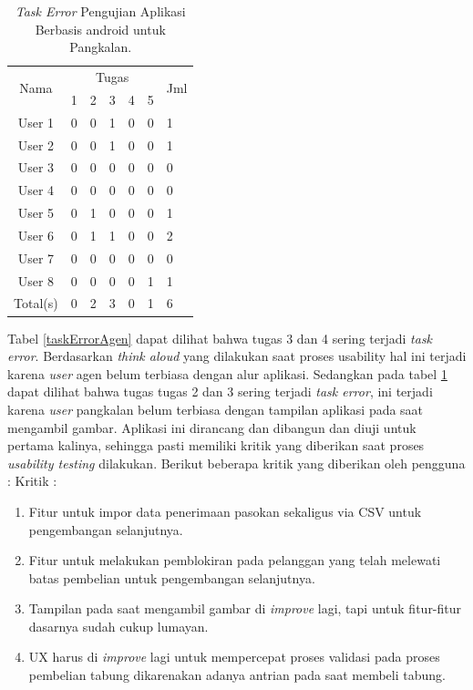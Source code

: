 \begin{table}[H]
	\center
	\caption{\textit{Task Error} Pengujian Aplikasi Berbasis android untuk Pangkalan.}
	\label{taskErrorPangkalan}
	\begin{tabular}{|c|l|l|l|l|l|l|}
		\hline
		\multirow{2}{*}{Nama} & \multicolumn{5}{c|}{Tugas} &  \multirow{2}{0.5cm}{Jml} \\ \cline{2-6} 
		&1 &2  &3 &4 &5& \\
		\hline
		User 1 &0 &0 &1 &0 &0 &1 \\ 
		\hline
		User 2 &0 &0 &1 &0 &0 &1  \\ 
		\hline
		User 3 &0 &0 &0 &0 &0 &0  \\ 
		\hline
		User 4 &0 &0 &0 &0 &0 &0  \\ 
		\hline
		User 5 &0 &1 &0 &0 &0 &1  \\ 
		\hline
		User 6 &0 &1 &1 &0 &0 &2  \\ 
		\hline
		User 7 &0 &0 &0 &0 &0 &0 \\ 
		\hline
		User 8 &0 &0 &0 &0 &1 &1 \\ 
		\hline
		Total(s)  &0 &2 &3 &0 &1 &6 \\ 
		\hline
	\end{tabular}
\end{table}
Tabel \ref{taskErrorAgen} dapat dilihat bahwa tugas 3 dan 4 sering terjadi \textit{task error}. Berdasarkan \textit{think aloud} yang dilakukan saat proses usability hal ini terjadi karena \textit{user} agen belum terbiasa dengan alur aplikasi. Sedangkan pada tabel \ref{taskErrorPangkalan} dapat dilihat bahwa tugas tugas 2 dan 3 sering terjadi \textit{task error}, ini  terjadi karena \textit{user} pangkalan belum terbiasa dengan tampilan aplikasi pada saat mengambil gambar.
Aplikasi ini dirancang dan dibangun dan diuji untuk pertama kalinya, sehingga pasti memiliki kritik  yang diberikan saat proses \textit{usability testing} dilakukan. Berikut beberapa kritik yang diberikan oleh pengguna : \newline \newline
Kritik :
\begin{enumerate}
	\item Fitur untuk impor data penerimaan pasokan sekaligus via CSV untuk pengembangan selanjutnya.
	\item Fitur untuk melakukan pemblokiran pada pelanggan yang telah melewati batas pembelian untuk pengembangan selanjutnya.
	\item Tampilan pada saat mengambil gambar di \textit{improve} lagi, tapi untuk fitur-fitur dasarnya sudah cukup lumayan.
	\item UX harus di \textit{improve} lagi untuk mempercepat proses validasi pada proses pembelian tabung dikarenakan adanya antrian pada saat membeli tabung.
	
\end{enumerate}  
	

